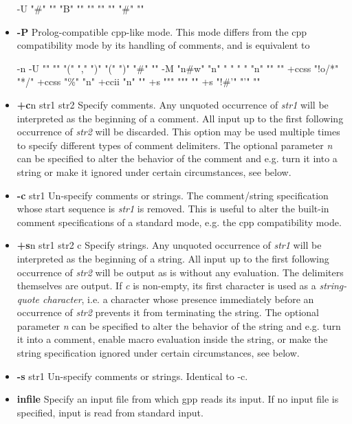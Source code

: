\begin{itemize}
\begin{PRE}
  -U "{\htmlLt}\#" "{\htmlGt}" "{\htmlBackslash}B" "{\htmlBar}" "{\htmlGt}" "{\htmlLt}" "{\htmlGt}" "\#" "{\htmlBackslash}{\htmlBackslash}"
\end{PRE}

\item {\bf -P}\htmlBR
Prolog-compatible cpp-like mode. This mode differs from the cpp compatibility
mode by its handling of comments, and is equivalent to 

\begin{PRE}
  -n -U "" "" "(" "," ")" "(" ")" "\#" ""
  -M "{\htmlBackslash}n\#{\htmlBackslash}w" "{\htmlBackslash}n" " " " " "{\htmlBackslash}n" "" ""
  +ccss "{\htmlBackslash}!o/*" "*/" +ccss "\%" "{\htmlBackslash}n" +ccii "{\htmlBackslash}{\htmlBackslash}{\htmlBackslash}n" ""
  +s "{\htmlBackslash}"" "{\htmlBackslash}"" "" +s "{\htmlBackslash}!\#'" "'" ""
\end{PRE}

\item {\bf +c}{\htmlLt}n{\htmlGt} str1 str2\htmlBR
Specify comments. Any unquoted occurrence of {\it str1} will be interpreted as
the beginning of a comment. All input up to the first following occurrence of
{\it str2} will be discarded. This option may be used multiple times to
specify different types of comment delimiters. The optional parameter {\it
{\htmlLt}n{\htmlGt}} can be specified to alter the behavior of the comment and
e.g. turn it into a string or make it ignored under certain circumstances, see
below. 

\item {\bf -c }str1\htmlBR
Un-specify comments or strings. The comment/string specification whose start
sequence is {\it str1} is removed. This is useful to alter the built-in
comment specifications of a standard mode, e.g. the cpp compatibility mode. 

\item {\bf +s}{\htmlLt}n{\htmlGt} str1 str2 c\htmlBR
Specify strings. Any unquoted occurrence of {\it str1} will be interpreted as
the beginning of a string. All input up to the first following occurrence of
{\it str2} will be output as is without any evaluation. The delimiters
themselves are output. If {\it c} is non-empty, its first character is used as
a {\it string-quote character}, i.e. a character whose presence immediately
before an occurrence of {\it str2} prevents it from terminating the string.
The optional parameter {\it {\htmlLt}n{\htmlGt}} can be specified to alter the
behavior of the string and e.g. turn it into a comment, enable macro
evaluation inside the string, or make the string specification ignored under
certain circumstances, see below. 

\item {\bf -s }str1\htmlBR
Un-specify comments or strings. Identical to -c. 

\item {\bf infile}\htmlBR
Specify an input file from which gpp reads its input. If no input file is
specified, input is read from standard input. 
\end{itemize}


